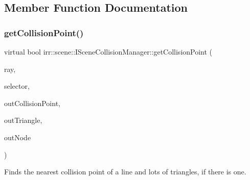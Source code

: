\subsection{Member Function Documentation}
\mbox{\label{classirr_1_1scene_1_1ISceneCollisionManager_a0adcf9dca228fac89b085144141f33b0}} 
\subsubsection{\texorpdfstring{get\+Collision\+Point()}{getCollisionPoint()}}
{\footnotesize\ttfamily virtual bool irr\+::scene\+::\+I\+Scene\+Collision\+Manager\+::get\+Collision\+Point (\begin{DoxyParamCaption}\item[{const \hyperlink{classirr_1_1core_1_1line3d}{core\+::line3d}$<$ \hyperlink{namespaceirr_a0277be98d67dc26ff93b1a6a1d086b07}{f32} $>$ \&}]{ray,  }\item[{\hyperlink{classirr_1_1scene_1_1ITriangleSelector}{I\+Triangle\+Selector} $\ast$}]{selector,  }\item[{\hyperlink{namespaceirr_1_1core_a06f169d08b5c429f5575acb7edbad811}{core\+::vector3df} \&}]{out\+Collision\+Point,  }\item[{\hyperlink{namespaceirr_1_1core_a1112835405bbec5dadf031dc7934e7d0}{core\+::triangle3df} \&}]{out\+Triangle,  }\item[{\hyperlink{classirr_1_1scene_1_1ISceneNode}{I\+Scene\+Node} $\ast$\&}]{out\+Node }\end{DoxyParamCaption})\hspace{0.3cm}{\ttfamily [pure virtual]}}



Finds the nearest collision point of a line and lots of triangles, if there is one. 


